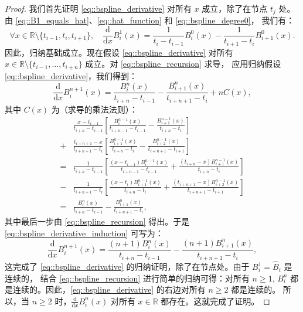 \documentclass[a4paper]{ctexart}
\numberwithin{theorem}{section}
\numberwithin{equation}{section}
\numberwithin{figure}{section}
\numberwithin{remark}{section}
\begin{document}
\begin{proof}
我们首先证明 \eqref{eq::bspline_derivative} 对所有 $x$ 成立，除了在节点 $t_j$ 处。由 \eqref{eq::B1_equals_hat}、\eqref{eq::hat_function} 和 \eqref{eq::bspline_degree0}，
我们有：
\[
\forall x \in \mathbb{R} \setminus \{t_{i-1}, t_i, t_{i+1}\}, \quad
\frac{\mathrm{d}}{\mathrm{d}x} B_i^1(x) = \frac{1}{t_i - t_{i-1}} B_i^0(x) - \frac{1}{t_{i+1} - t_i} B_{i+1}^0(x).
\]
因此，归纳基础成立。现在假设 \eqref{eq::bspline_derivative} 对所有 $x \in \mathbb{R} \setminus \{t_{i-1}, \ldots, t_{i+n}\}$ 成立。对 \eqref{eq::bspline_recursion} 求导，
应用归纳假设 \eqref{eq::bspline_derivative}，我们得到：
\begin{equation}
\label{eq::bspline_derivative_induction}
\frac{\mathrm{d}}{\mathrm{d}x} B_i^{n+1}(x) = \frac{B_i^n(x)}{t_{i+n} - t_{i-1}} - \frac{B_{i+1}^n(x)}{t_{i+n+1} - t_i} + n C(x), 
\end{equation}
其中 $C(x)$ 为（求导的乘法法则）：
\begin{align*}
&\frac{x - t_{i-1}}{t_{i+n} - t_{i-1}} \left[ \frac{B_i^{n-1}(x)}{t_{i+n-1} - t_{i-1}} - \frac{B_{i+1}^{n-1}(x)}{t_{i+n} - t_i} \right] \\
+ &\frac{t_{i+n+1} - x}{t_{i+n+1} - t_i} \left[ \frac{B_{i+1}^{n-1}(x)}{t_{i+n} - t_i} - \frac{B_{i+2}^{n-1}(x)}{t_{i+n+1} - t_{i+1}} \right] \\
= &\frac{1}{t_{i+n} - t_{i-1}} \left[ \frac{(x - t_{i-1}) B_i^{n-1}(x)}{t_{i+n-1} - t_{i-1}} + \frac{(t_{i+n} - x) B_{i+1}^{n-1}(x)}{t_{i+n} - t_i} \right] \\
- &\frac{1}{t_{i+n+1} - t_i} \left[ \frac{(x - t_i) B_{i+1}^{n-1}(x)}{t_{i+n} - t_i} + \frac{(t_{i+n+1} - x) B_{i+2}^{n-1}(x)}{t_{i+n+1} - t_{i+1}} \right] \\
= &\frac{B_i^n(x)}{t_{i+n} - t_{i-1}} - \frac{B_{i+1}^n(x)}{t_{i+n+1} - t_i},
\end{align*}
其中最后一步由 \eqref{eq::bspline_recursion} 得出。于是 \eqref{eq::bspline_derivative_induction} 可写为：
\[
\frac{\mathrm{d}}{\mathrm{d}x} B_i^{n+1}(x) = \frac{(n+1) B_i^n(x)}{t_{i+n} - t_{i-1}} - \frac{(n+1) B_{i+1}^n(x)}{t_{i+n+1} - t_i},
\]
这完成了 \eqref{eq::bspline_derivative} 的归纳证明，除了在节点处。由于 $B_i^1 = \hat{B}_i$ 是连续的，
结合 \eqref{eq::bspline_recursion} 进行简单的归纳可得：对所有 $n \geq 1$, $B_i^n$ 都是连续的。因此，\eqref{eq::bspline_derivative} 的右边对所有 $n \geq 2$ 都是连续的。
所以，当 $n \geq 2$ 时，$\frac{\mathrm{d}}{\mathrm{d}x} B_i^n(x)$ 对所有 $x \in \mathbb{R}$ 都存在。这就完成了证明。

\end{proof}
\end{document}
